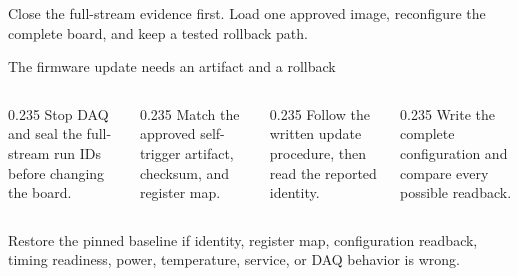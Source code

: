 \documentclass[aspectratio=169,11pt]{beamer}
\begin{document}
  {Close the full-stream evidence first. Load one approved image, reconfigure the complete board, and keep a tested rollback path.}

\begin{frame}{The firmware update needs an artifact and a rollback}
  \begin{columns}[T,onlytextwidth]
    \begin{column}{0.235\textwidth}
        {Stop DAQ and seal the full-stream run IDs before changing the board.}
    \end{column}
    \begin{column}{0.235\textwidth}
        {Match the approved self-trigger artifact, checksum, and register map.}
    \end{column}
    \begin{column}{0.235\textwidth}
        {Follow the written update procedure, then read the reported identity.}
    \end{column}
    \begin{column}{0.235\textwidth}
        {Write the complete configuration and compare every possible readback.}
    \end{column}
  \end{columns}

  \medskip
    {Restore the pinned baseline if identity, register map, configuration readback, timing readiness, power, temperature, service, or DAQ behavior is wrong.}
\end{frame}
\end{document}
